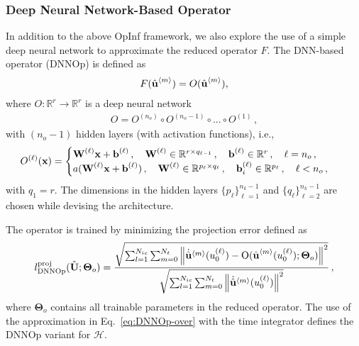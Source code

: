 \subsubsection{Deep Neural Network-Based Operator}\label{sec: dnnop}

In addition to the above OpInf framework, we also explore the use of a simple deep neural network to approximate the reduced operator $F$. The DNN-based operator (DNNOp) is defined as
\begin{align}\label{eq:DNNOp-over}
    F(\hat{\textbf{u}}^{\left<m\right>}) = O(\hat{\textbf{u}}^{\left<m\right>}),
\end{align}
where $O:\mathbb{R}^r \to \mathbb{R}^r$ is a deep neural network
    \begin{align}
    O =  O^{(n_o)} \circ O^{(n_o -1)} \circ ... \circ O^{(1)}\,,
    \end{align}
    with $(n_o-1)$ hidden layers (with activation functions), i.e.,
    \begin{align}
    O^{(\ell)}(\textbf{x}) &= 
    \begin{cases} 
        \textbf{W}^{(\ell)} \textbf{x} + \textbf{b}^{(\ell)}\,, \quad \textbf{W}^{(\ell)} \in \mathbb{R}^{r \times q_{\ell - 1}}\,, \quad \textbf{b}^{(\ell)} \in \mathbb{R}^r\,,\quad \ell = n_o\,,\\
        a(\textbf{W}^{(\ell)} \textbf{x} + \textbf{b}^{(\ell)})\,, \quad \textbf{W}^{(\ell)} \in \mathbb{R}^{p_\ell \times q_\ell} \,, \quad \textbf{b}^{(\ell)}_i \in \mathbb{R}^{p_\ell}\,, \quad \ell < n_o\,,
    \end{cases}
    \end{align}
    with $q_1 = r$. The dimensions in the hidden layers $\{p_\ell\}_{\ell = 1}^{n_k - 1}$ and $\{q_\ell\}_{\ell = 2}^{n_k - 1}$ are chosen while devising the architecture.
    
The operator is trained by minimizing the projection error defined as
\begin{align}
    l^{\text{proj}}_{\text{DNNOp}}(\hat{\textbf{U}}; \boldsymbol{\Theta}_o) = \frac{\sqrt{\sum_{l=1}^{N_{ic}}\sum_{m=0}^{N_t}{\left\lVert\dot{\hat{\textbf{u}}}^{\left<m\right>}(u_0^{(\ell)}) - \text{O}(\hat{\textbf{u}}^{\left<m\right>}(u_0^{(\ell)}); \boldsymbol{\Theta}_o)\right\rVert}^2}}{\sqrt{\sum_{l=1}^{N_{ic}}\sum_{m=0}^{N_t}{\left\lVert\dot{\hat{\textbf{u}}}^{\left<m\right>}(u_0^{(\ell)})\right\rVert}^2}}\,,
\end{align}
where $\boldsymbol{\Theta}_o$ contains all trainable parameters in the reduced operator. The use of the approximation in Eq.~\eqref{eq:DNNOp-over} with the time integrator defines the DNNOp variant for $\mathcal{H}$.

